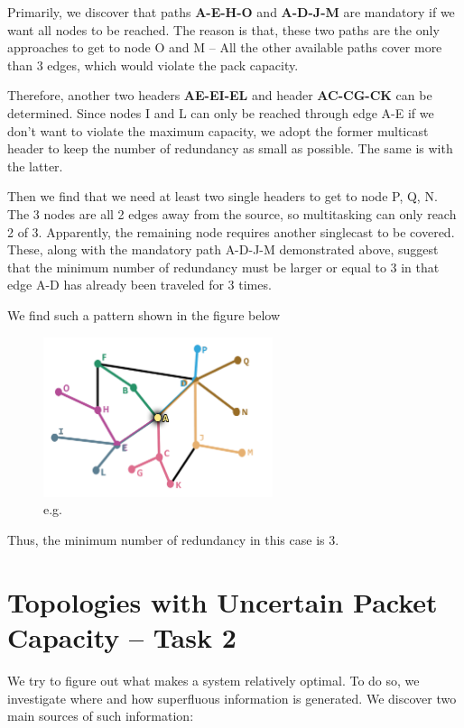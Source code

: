 \documentclass{mcmthesis}
\begin{document}
Primarily, we discover that paths \textcolor[RGB]{180,76,151}{\bf{A-E-H-O}} and \textcolor[RGB]{230,176,112}{\bf{A-D-J-M}} are mandatory if we want all nodes to be reached. The reason is that, these two paths are the only approaches to get to node O and M -- All the other available paths cover more than 3 edges, which would violate the pack capacity.

Therefore, another two headers \textcolor[RGB]{91,126,145}{\bf{AE-EI-EL}} and header \textcolor[RGB]{222,108,141}{\bf{AC-CG-CK}} can be determined. Since nodes I and L can only be reached through edge A-E if we don't want to violate the maximum capacity, we adopt the former multicast header to keep the number of redundancy as small as possible. The same is with the latter.

Then we find that we need at least two single headers to get to node P, Q, N. The 3 nodes are all 2 edges away from the source, so multitasking can only reach 2 of 3. Apparently, the remaining node requires another singlecast to be covered. These, along with the mandatory path A-D-J-M demonstrated above, suggest that the minimum number of redundancy must be larger or equal to 3 in that edge A-D has already been traveled for 3 times.

We find such a pattern shown in the figure below

\begin{figure}[H]
	\centering
	\includegraphics[width = 0.6\textwidth]{figure/fig.1-2.png}
	\caption{e.g.}
	\label{fig:1-2}
\end{figure}

Thus, the minimum number of redundancy in this case is 3.


\section{Topologies with Uncertain Packet Capacity -- Task 2}

We try to figure out what makes a system relatively optimal. To do so, we investigate where and how superfluous information is generated. We discover two main sources of such information:
\end{document}
